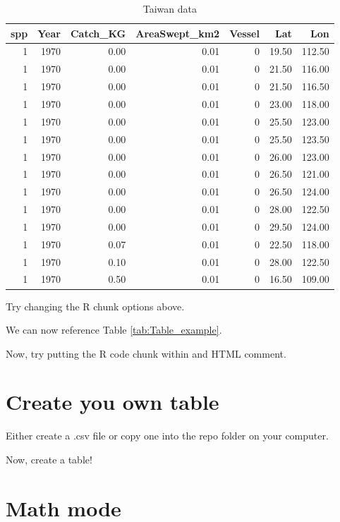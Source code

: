 \documentclass[12pt,]{article}
\begin{document}
\begin{table}[ht]
\centering
\caption{Taiwan data} 
\label{tab:Taiwan}
\begin{tabular}{rrrrrrr}
  \hline
spp & Year & Catch\_KG & AreaSwept\_km2 & Vessel & Lat & Lon \\ 
  \hline
  1 & 1970 & 0.00 & 0.01 &   0 & 19.50 & 112.50 \\ 
    1 & 1970 & 0.00 & 0.01 &   0 & 21.50 & 116.00 \\ 
    1 & 1970 & 0.00 & 0.01 &   0 & 21.50 & 116.50 \\ 
    1 & 1970 & 0.00 & 0.01 &   0 & 23.00 & 118.00 \\ 
    1 & 1970 & 0.00 & 0.01 &   0 & 25.50 & 123.00 \\ 
    1 & 1970 & 0.00 & 0.01 &   0 & 25.50 & 123.50 \\ 
    1 & 1970 & 0.00 & 0.01 &   0 & 26.00 & 123.00 \\ 
    1 & 1970 & 0.00 & 0.01 &   0 & 26.50 & 121.00 \\ 
    1 & 1970 & 0.00 & 0.01 &   0 & 26.50 & 124.00 \\ 
    1 & 1970 & 0.00 & 0.01 &   0 & 28.00 & 122.50 \\ 
    1 & 1970 & 0.00 & 0.01 &   0 & 29.50 & 124.00 \\ 
    1 & 1970 & 0.07 & 0.01 &   0 & 22.50 & 118.00 \\ 
    1 & 1970 & 0.10 & 0.01 &   0 & 28.00 & 122.50 \\ 
    1 & 1970 & 0.50 & 0.01 &   0 & 16.50 & 109.00 \\ 
   \hline
\end{tabular}
\end{table}

Try changing the R chunk options above.

We can now reference Table \ref{tab:Table_example}.

Now, try putting the R code chunk within and HTML comment.

\section{Create you own table}\label{create-you-own-table}

Either create a .csv file or copy one into the repo folder on your
computer.

Now, create a table!

\section{Math mode}\label{math-mode}
\end{document}
